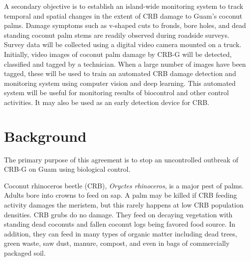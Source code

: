 \documentclass[14pt,english,letterpaper]{scrartcl}
\begin{document}
A secondary objective is to establish an island-wide monitoring system to track temporal and
spatial changes in the extent of CRB damage to Guam’s coconut palms. Damage symptoms such
as v-shaped cuts to fronds, bore holes, and dead standing coconut palm stems are readily
observed during roadside surveys. Survey data will be collected using a digital video
camera mounted on a truck. Initially, video images of coconut palm damage by CRB-G will be
detected, classified and tagged by a technician. When a large number of images have been
tagged, these will be used to train an automated CRB damage detection and monitoring
system using computer vision and deep learning. This automated system will be useful for monitoring results of biocontrol and other control activities. It may also be used as an early detection device for CRB.

\section{Background} 

%

The primary purpose of this agreement is to stop an uncontrolled outbreak of CRB-G on Guam using biological control.

Coconut rhinoceros beetle (CRB), \textit{Oryctes rhinoceros}, is a major pest of palms. Adults bore into
crowns to feed on sap. A palm may be killed if CRB feeding activity damages the meristem, but
this rarely happens at low CRB population densities. CRB grubs do no damage. They feed on
decaying vegetation with standing dead coconuts and fallen coconut logs being favored food source. In
addition, they can feed in many types of organic matter including dead trees, green waste, saw
dust, manure, compost, and even in bags of commercially packaged soil.
\end{document}
